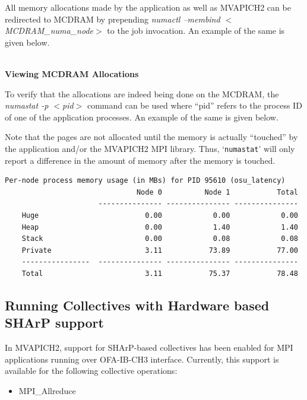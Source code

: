 All memory allocations made by the application as well as MVAPICH2 can be
redirected to MCDRAM by prepending \textit{numactl --membind
$<$MCDRAM\_numa\_node$>$} to the job invocation. An example of the same is given
below.

 \\

\noindent \textbf{Viewing MCDRAM Allocations}

\noindent To verify that the allocations are indeed being done on the MCDRAM,
the \textit{numastat -p $<$pid$>$} command can be used where ``pid'' refers to the
process ID of one of the application processes. An example of the same is given
below.

Note that the pages are not allocated until the memory is actually ``touched''
by the application and/or the MVAPICH2 MPI library. Thus, `\texttt{numastat}'
will only report a difference in the amount of memory after the memory is
touched.

\noindent\begin{verbatim} 
Per-node process memory usage (in MBs) for PID 95610 (osu_latency)
   		                       Node 0          Node 1           Total
       		          --------------- --------------- ---------------
	Huge                         0.00            0.00            0.00
	Heap                         0.00            1.40            1.40
	Stack                        0.00            0.08            0.08
	Private                      3.11           73.89           77.00
	----------------  --------------- --------------- ---------------
	Total                        3.11           75.37           78.48  
\end{verbatim}   
\subsection{Running Collectives with Hardware based SHArP support}
\label{subsec:coll-sharp}

In MVAPICH2, support for SHArP-based collectives has been enabled for MPI
applications running over OFA-IB-CH3 interface. Currently, this support is
available for the following collective operations:

\begin{itemize}
		\item{MPI\_Allreduce}
\end{itemize}

